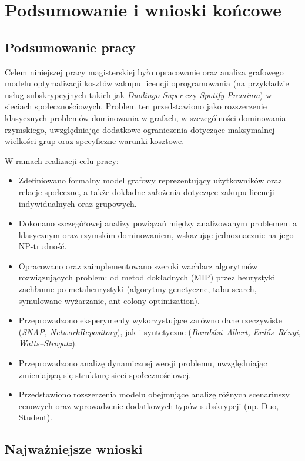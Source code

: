 \chapter{Podsumowanie i wnioski końcowe}

\section{Podsumowanie pracy}

Celem niniejszej pracy magisterskiej było opracowanie oraz analiza grafowego modelu optymalizacji kosztów zakupu licencji oprogramowania (na przykładzie usług subskrypcyjnych takich jak \textit{Duolingo Super} czy \textit{Spotify Premium}) w sieciach społecznościowych. Problem ten przedstawiono jako rozszerzenie klasycznych problemów dominowania w grafach, w szczególności dominowania rzymskiego, uwzględniając dodatkowe ograniczenia dotyczące maksymalnej wielkości grup oraz specyficzne warunki kosztowe.

W ramach realizacji celu pracy:

\begin{itemize}
    \item Zdefiniowano formalny model grafowy reprezentujący użytkowników oraz relacje społeczne, a także dokładne założenia dotyczące zakupu licencji indywidualnych oraz grupowych.
    \item Dokonano szczegółowej analizy powiązań między analizowanym problemem a klasycznym oraz rzymskim dominowaniem, wskazując jednoznacznie na jego NP-trudność.
    \item Opracowano oraz zaimplementowano szeroki wachlarz algorytmów rozwiązujących problem: od metod dokładnych (MIP) przez heurystyki zachłanne po metaheurystyki (algorytmy genetyczne, tabu search, symulowane wyżarzanie, ant colony optimization).
    \item Przeprowadzono eksperymenty wykorzystujące zarówno dane rzeczywiste (\textit{SNAP, NetworkRepository}), jak i syntetyczne (\textit{Barabási–Albert, Erdős–Rényi, Watts–Strogatz}).
    \item Przeprowadzono analizę dynamicznej wersji problemu, uwzględniając zmieniającą się strukturę sieci społecznościowej.
    \item Przedstawiono rozszerzenia modelu obejmujące analizę różnych scenariuszy cenowych oraz wprowadzenie dodatkowych typów subskrypcji (np. Duo, Student).
\end{itemize}

\section{Najważniejsze wnioski}

